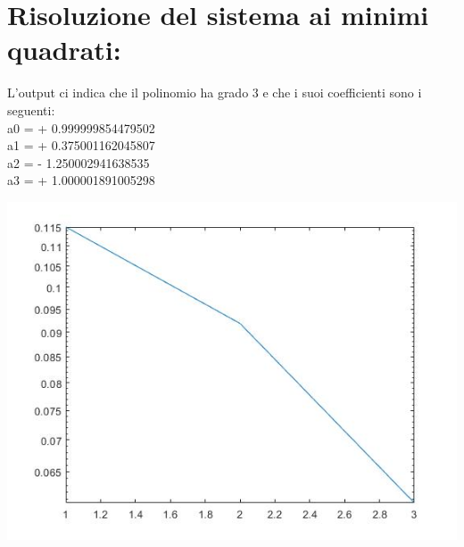 \section*{Risoluzione del sistema ai minimi quadrati:}

\newpage
L'output ci indica che il polinomio ha grado 3 e che i suoi coefficienti sono i seguenti:\\


a0 = + 0.999999854479502\\
a1 = + 0.375001162045807\\
a2 = - 1.250002941638535\\
a3 = + 1.000001891005298

\includegraphics[width=1\linewidth]{img/21Norma.jpg}

